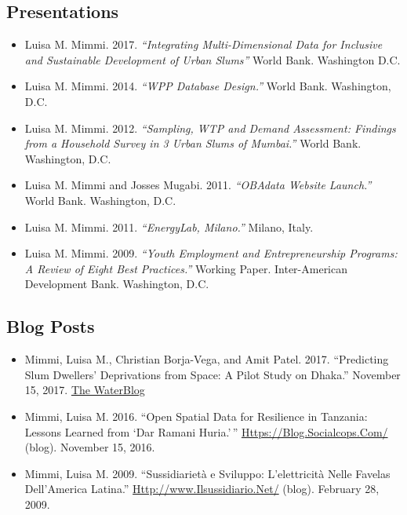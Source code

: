 \documentclass[]{article}
\providecommand{\tightlist}{%
  \setlength{\itemsep}{0pt}\setlength{\parskip}{0pt}}
\begin{document}
\hypertarget{presentations}{%
\subsection{Presentations}\label{presentations}}

\begin{itemize}
\tightlist
\item
  Luisa M. Mimmi. 2017. \emph{``Integrating Multi-Dimensional Data for
  Inclusive and Sustainable Development of Urban Slums''} World Bank.
  Washington D.C.
\item
  Luisa M. Mimmi. 2014. \emph{``WPP Database Design.''} World Bank.
  Washington, D.C.\\
\item
  Luisa M. Mimmi. 2012. \emph{``Sampling, WTP and Demand Assessment:
  Findings from a Household Survey in 3 Urban Slums of Mumbai.''} World
  Bank. Washington, D.C.\\
\item
  Luisa M. Mimmi and Josses Mugabi. 2011. \emph{``OBAdata Website
  Launch.''} World Bank. Washington, D.C.\\
\item
  Luisa M. Mimmi. 2011. \emph{``EnergyLab, Milano.''} Milano, Italy.
\item
  Luisa M. Mimmi. 2009. \emph{``Youth Employment and Entrepreneurship
  Programs: A Review of Eight Best Practices.''} Working Paper.
  Inter-American Development Bank. Washington, D.C.
\end{itemize}

\hypertarget{blog-posts}{%
\subsection{Blog Posts}\label{blog-posts}}

\begin{itemize}
\tightlist
\item
  Mimmi, Luisa M., Christian Borja-Vega, and Amit Patel. 2017.
  ``Predicting Slum Dwellers' Deprivations from Space: A Pilot Study on
  Dhaka.'' November 15, 2017.
  \href{http://blogs.worldbank.org/water/node/789}{The WaterBlog}
\item
  Mimmi, Luisa M. 2016. ``Open Spatial Data for Resilience in Tanzania:
  Lessons Learned from `Dar Ramani Huria.'\,''
  \url{Https://Blog.Socialcops.Com/} (blog). November 15, 2016.
\item
  Mimmi, Luisa M. 2009. ``Sussidiarietà e Sviluppo: L'elettricità Nelle
  Favelas Dell'America Latina.'' \url{Http://www.Ilsussidiario.Net/}
  (blog). February 28, 2009.
\end{itemize}
\end{document}
